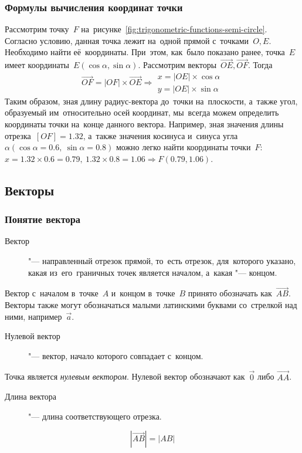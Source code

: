 \documentclass[]{scrartcl}
\begin{document}
\subsubsection{Формулы вычисления координат точки}
Рассмотрим точку~${\textstyle F}$ на~рисунке~\ref{fig:trigonometric-functions-semi-circle}. Согласно условию, данная точка лежит на~одной прямой с~точками~${\textstyle O,E}$. Необходимо найти её~координаты. При~этом, как~было показано ранее, точка~${\textstyle E}$ имеет координаты~${\textstyle E(\cos \alpha, \sin \alpha)}$. Рассмотрим векторы~${\textstyle \vec{OE}, \vec{OF}}$. Тогда
\begin{equation}\label{eq:point-coordinates}
\vec{OF}=|OF|\times \vec{OE} \Rightarrow
\begin{aligned}
x=|OE|\times \cos \alpha\\
y=|OE|\times \sin \alpha
\end{aligned}
\end{equation}
Таким образом, зная длину радиус-вектора до~точки на~плоскости, а~также угол, образуемый им~относительно осей координат, мы~всегда можем определить координаты точки на~конце данного вектора. Например, зная значения длины отрезка~${\textstyle [OF]=1.32}$, а~также значения косинуса и~синуса угла~${\textstyle \alpha (\cos \alpha = 0.6,\ \sin \alpha =0.8)}$ можно легко найти координаты точки~${\textstyle F}$: ${\textstyle x=1.32 \times 0.6=0.79,\ 1.32 \times 0.8=1.06 \Rightarrow F(0.79,1.06)}$.
%
\subsection{Векторы}
\subsubsection{Понятие вектора}
\begin{description}
	\item[Вектор] "--- направленный отрезок прямой, то~есть отрезок, для~которого указано, какая из~его~граничных точек является началом, а~какая "--- концом.
\end{description}
Вектор с~началом в~точке~${\textstyle A}$ и~концом в~точке~${\textstyle B}$ принято обозначать как~${\textstyle {\overrightarrow {AB}}}$. Векторы также могут обозначаться малыми латинскими буквами со~стрелкой над ними, например~${\textstyle {\vec {a}}}$.
\begin{description}
	\item[Нулевой вектор] "--- вектор, начало которого совпадает с~концом.
\end{description}
Точка является \emph{нулевым вектором}. Нулевой вектор обозначают как~${\textstyle {\vec {0}}}$ либо ${\textstyle {\overrightarrow {AA}}}$.
\begin{description}
	\item[Длина вектора] "--- длина соответствующего отрезка.
\end{description}
\begin{equation}\label{eq:vector-lenght}
|{\overrightarrow {AB}}|=|AB|
\end{equation}
\end{document}
